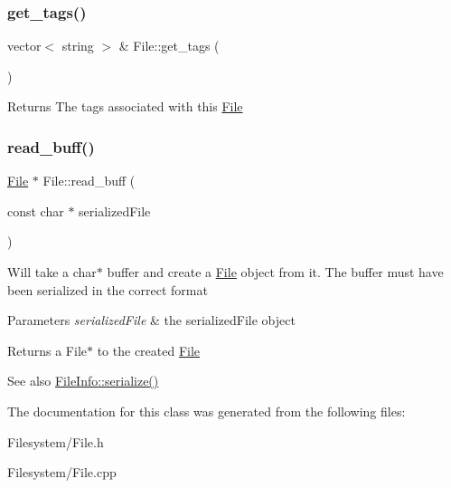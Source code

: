 \subsubsection{\texorpdfstring{get\+\_\+tags()}{get\_tags()}}
{\footnotesize\ttfamily vector$<$ string $>$ \& File\+::get\+\_\+tags (\begin{DoxyParamCaption}{ }\end{DoxyParamCaption})}

\begin{DoxyReturn}{Returns}
The tags associated with this \mbox{\hyperlink{classFile}{File}} 
\end{DoxyReturn}
\mbox{\label{classFile_a1118d477e6b00d789e948e8cca5ae393}} 
\subsubsection{\texorpdfstring{read\+\_\+buff()}{read\_buff()}}
{\footnotesize\ttfamily \mbox{\hyperlink{classFile}{File}} $\ast$ File\+::read\+\_\+buff (\begin{DoxyParamCaption}\item[{const char $\ast$}]{serialized\+File }\end{DoxyParamCaption})\hspace{0.3cm}{\ttfamily [static]}}

Will take a char$\ast$ buffer and create a \mbox{\hyperlink{classFile}{File}} object from it. The buffer must have been serialized in the correct format 
\begin{DoxyParams}{Parameters}
{\em serialized\+File} & the serialized\+File object \\
\hline
\end{DoxyParams}
\begin{DoxyReturn}{Returns}
a File$\ast$ to the created \mbox{\hyperlink{classFile}{File}} 
\end{DoxyReturn}
\begin{DoxySeeAlso}{See also}
\mbox{\hyperlink{classFileInfo_a64fc62c3e376dfd61088932d8b793589}{File\+Info\+::serialize()}} 
\end{DoxySeeAlso}


The documentation for this class was generated from the following files\+:\begin{DoxyCompactItemize}
\item 
Filesystem/File.\+h\item 
Filesystem/File.\+cpp\end{DoxyCompactItemize}
